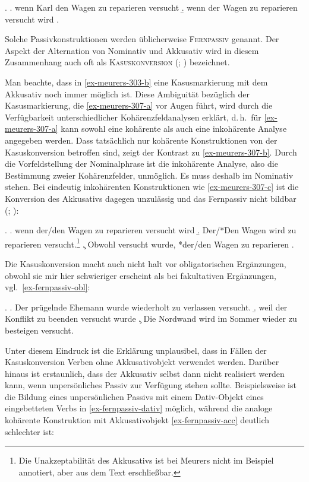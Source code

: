 \ex.
\a. wenn Karl den Wagen zu reparieren versucht \label{ex-meurers-303-a}
\b. wenn der Wagen zu reparieren versucht wird \label{ex-meurers-303-b}
\z. \citep[176]{Hoehle:78}

Solche Passivkonstruktionen werden üblicherweise \textsc{Fernpassiv} genannt. Der Aspekt der Alternation von Nominativ und Akkusativ wird in diesem Zusammenhang auch oft als \textsc{Kasuskonversion} (\citealt[Abschnitt~9.3]{Haider:93}; \citealt[Abschnitt~4.1]{Woellstein:01}) bezeichnet. 

Man beachte, dass in \ref{ex-meurers-303-b} eine Kasusmarkierung mit dem Akkusativ noch immer möglich ist. Diese Ambiguität bezüglich der Kasusmarkierung, die \ref{ex-meurers-307-a} vor Augen führt, wird durch die Verfügbarkeit unterschiedlicher Kohärenzfeldanalysen erklärt, d.\,h.\ für \ref{ex-meurers-307-a} kann sowohl eine kohärente als auch eine inkohärente Analyse angegeben werden. Dass tatsächlich nur kohärente Konstruktionen von der Kasuskonversion betroffen sind, zeigt der Kontrast zu \ref{ex-meurers-307-b}. Durch die Vorfeldstellung der Nominalphrase ist die inkohärente Analyse, also die Bestimmung zweier Kohärenzfelder, unmöglich. Es muss deshalb im Nominativ stehen. Bei eindeutig inkohärenten Konstruktionen wie \ref{ex-meurers-307-c} ist die Konversion des Akkusativs dagegen unzulässig und das Fernpassiv nicht bildbar (\citealt[136]{Kiss:95}; \citealt[304]{Meurers:99}):  

\ex. \label{ex-meurers-307}
\a. wenn der/den Wagen zu reparieren versucht wird \label{ex-meurers-307-a}
\b. Der/*Den Wagen wird zu reparieren versucht.\footnote{Die Unakzeptabilität des Akkusativs ist bei Meurers nicht im Beispiel annotiert, aber aus dem Text erschlie\ss bar.} \label{ex-meurers-307-b}
\c. Obwohl versucht wurde, *der/den Wagen zu reparieren \label{ex-meurers-307-c}
\z. \citep[(306), (307)]{Meurers:99}

Die Kasuskonversion macht auch nicht halt vor obligatorischen Ergänzungen, obwohl sie mir hier schwieriger erscheint als bei fakultativen Ergänzungen, vgl.\ \ref{ex-fernpassiv-obl}: 

\ex. \label{ex-fernpassiv-obl}
\a. Der prügelnde Ehemann wurde wiederholt zu verlassen versucht.
\b. weil der Konflikt zu beenden versucht wurde \hfill \citep[(1a)]{Sabel:01}
\c. Die Nordwand wird im Sommer wieder zu besteigen versucht.

Unter diesem Eindruck ist die Erklärung unplausibel, dass in Fällen der Kasuskonversion Verben ohne Akkusativobjekt verwendet werden. Darüber hinaus ist erstaunlich, dass der Akkusativ selbst dann nicht realisiert werden kann, wenn unpersönliches Passiv zur Verfügung stehen sollte. Beispielsweise ist die Bildung eines unpersönlichen Passivs mit einem Dativ-Objekt eines eingebetteten Verbs in \ref{ex-fernpassiv-dativ} möglich, während die analoge kohärente Konstruktion mit Akkusativobjekt \ref{ex-fernpassiv-acc} deutlich schlechter ist:

